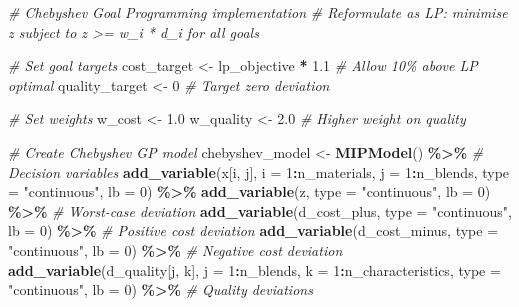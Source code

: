 \documentclass[
]{article}
\newenvironment{Shaded}{\begin{snugshade}}{\end{snugshade}}
\newcommand{\AttributeTok}[1]{\textcolor[rgb]{0.13,0.29,0.53}{#1}}
\newcommand{\CommentTok}[1]{\textcolor[rgb]{0.56,0.35,0.01}{\textit{#1}}}
\newcommand{\DecValTok}[1]{\textcolor[rgb]{0.00,0.00,0.81}{#1}}
\newcommand{\FloatTok}[1]{\textcolor[rgb]{0.00,0.00,0.81}{#1}}
\newcommand{\FunctionTok}[1]{\textcolor[rgb]{0.13,0.29,0.53}{\textbf{#1}}}
\newcommand{\NormalTok}[1]{#1}
\newcommand{\OtherTok}[1]{\textcolor[rgb]{0.56,0.35,0.01}{#1}}
\newcommand{\SpecialCharTok}[1]{\textcolor[rgb]{0.81,0.36,0.00}{\textbf{#1}}}
\newcommand{\StringTok}[1]{\textcolor[rgb]{0.31,0.60,0.02}{#1}}
\begin{document}
\begin{Shaded}
\begin{Highlighting}[]
\CommentTok{\# Chebyshev Goal Programming implementation}
\CommentTok{\# Reformulate as LP: minimise z subject to z \textgreater{}= w\_i * d\_i for all goals}

\CommentTok{\# Set goal targets}
\NormalTok{cost\_target }\OtherTok{\textless{}{-}}\NormalTok{ lp\_objective }\SpecialCharTok{*} \FloatTok{1.1}  \CommentTok{\# Allow 10\% above LP optimal}
\NormalTok{quality\_target }\OtherTok{\textless{}{-}} \DecValTok{0}  \CommentTok{\# Target zero deviation}

\CommentTok{\# Set weights}
\NormalTok{w\_cost }\OtherTok{\textless{}{-}} \FloatTok{1.0}
\NormalTok{w\_quality }\OtherTok{\textless{}{-}} \FloatTok{2.0}  \CommentTok{\# Higher weight on quality}

\CommentTok{\# Create Chebyshev GP model}
\NormalTok{chebyshev\_model }\OtherTok{\textless{}{-}} \FunctionTok{MIPModel}\NormalTok{() }\SpecialCharTok{\%\textgreater{}\%}
  \CommentTok{\# Decision variables}
  \FunctionTok{add\_variable}\NormalTok{(x[i, j], }\AttributeTok{i =} \DecValTok{1}\SpecialCharTok{:}\NormalTok{n\_materials, }\AttributeTok{j =} \DecValTok{1}\SpecialCharTok{:}\NormalTok{n\_blends, }\AttributeTok{type =} \StringTok{"continuous"}\NormalTok{, }\AttributeTok{lb =} \DecValTok{0}\NormalTok{) }\SpecialCharTok{\%\textgreater{}\%}
  \FunctionTok{add\_variable}\NormalTok{(z, }\AttributeTok{type =} \StringTok{"continuous"}\NormalTok{, }\AttributeTok{lb =} \DecValTok{0}\NormalTok{) }\SpecialCharTok{\%\textgreater{}\%}  \CommentTok{\# Worst{-}case deviation}
  \FunctionTok{add\_variable}\NormalTok{(d\_cost\_plus, }\AttributeTok{type =} \StringTok{"continuous"}\NormalTok{, }\AttributeTok{lb =} \DecValTok{0}\NormalTok{) }\SpecialCharTok{\%\textgreater{}\%}  \CommentTok{\# Positive cost deviation}
  \FunctionTok{add\_variable}\NormalTok{(d\_cost\_minus, }\AttributeTok{type =} \StringTok{"continuous"}\NormalTok{, }\AttributeTok{lb =} \DecValTok{0}\NormalTok{) }\SpecialCharTok{\%\textgreater{}\%}  \CommentTok{\# Negative cost deviation}
  \FunctionTok{add\_variable}\NormalTok{(d\_quality[j, k], }\AttributeTok{j =} \DecValTok{1}\SpecialCharTok{:}\NormalTok{n\_blends, }\AttributeTok{k =} \DecValTok{1}\SpecialCharTok{:}\NormalTok{n\_characteristics, }
               \AttributeTok{type =} \StringTok{"continuous"}\NormalTok{, }\AttributeTok{lb =} \DecValTok{0}\NormalTok{) }\SpecialCharTok{\%\textgreater{}\%}  \CommentTok{\# Quality deviations}
  

\end{Highlighting}
\end{Shaded}
\end{document}

